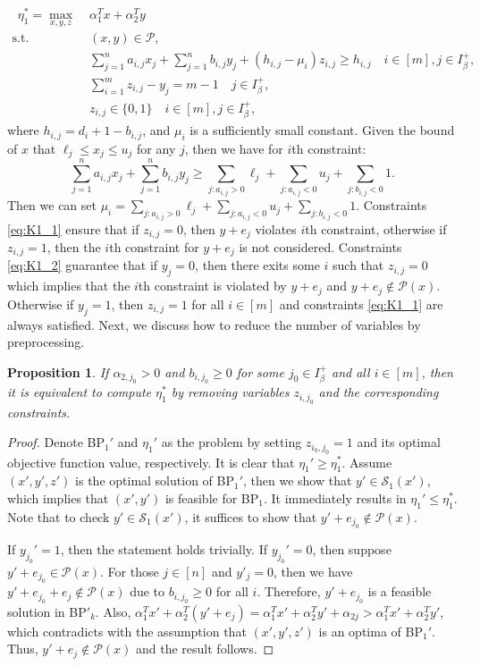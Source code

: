 \documentclass[11pt]{article}
\newtheorem{proposition}{Proposition}
\newcommand{\Pp}{\mathcal{P}}
\newcommand{\Ss}{\mathcal{S}}
\begin{document}
\begin{align}
[\text{BP}_1]~~\eta_1^* = \max_{x, y, z}\; & \alpha_1^Tx + \alpha_2^Ty \nonumber \\
\text{s.t.~~} &  (x, y)\in \Pp, \nonumber \\
& \sum_{j=1}^n a_{i,j} x_j + \sum_{j=1}^n b_{i,j} y_j + (h_{i,j} - \mu_i)z_{i,j} \geq h_{i,j} \quad i \in [m], j\in I_\beta^+, \label{eq:K1_1} \\
& \sum_{i=1}^m z_{i,j} - y_j = m - 1  \quad j\in I_\beta^+, \label{eq:K1_2} \\
& z_{i,j} \in \{0,1\} \quad i \in [m], j\in I_\beta^+, \nonumber
\end{align}
where $h_{i,j} = d_i + 1 - b_{i, j}$, and $\mu_i$ is a sufficiently small constant. Given the bound of $x$ that $\ell_j \leq x_j \leq u_j$ for any $j$, then we have for $i$th constraint:
\[\sum_{j=1}^n a_{i,j} x_j + \sum_{j=1}^n b_{i,j} y_j \geq \sum_{j: a_{i,j} > 0} \ell_j + \sum_{j:a_{i,j}<0}u_j + \sum_{j:b_{i,j}<0} 1. \]
Then we can set $\mu_i = \sum_{j: a_{i,j} > 0} \ell_j + \sum_{j:a_{i,j}<0}u_j + \sum_{j:b_{i,j}<0} 1$. Constraints \eqref{eq:K1_1} ensure that if $z_{i,j} = 0$, then $y + e_j$ violates $i$th constraint, otherwise if $z_{i,j} = 1$, then the $i$th constraint for $y + e_j$ is not considered. Constraints \eqref{eq:K1_2} guarantee that if $y_j = 0$, then there exits some $i$ such that $z_{i,j} = 0$ which implies that the $i$th constraint is violated by $y+e_j$ and $y+e_j \notin \Pp(x)$. Otherwise if $y_j = 1$, then $z_{i,j} = 1$ for all $i \in [m]$ and constraints \eqref{eq:K1_1} are always satisfied.  Next, we discuss how to reduce the number of variables by preprocessing.
\begin{proposition}
	If $\alpha_{2,j_0} > 0$ and $b_{i, j_0} \geq 0$ for some $j_0\in I_\beta^+$ and all $i\in [m]$, then it is equivalent to compute $\eta_1^*$ by removing variables $z_{i, j_0}$ and the corresponding constraints.
\end{proposition}
\begin{proof}
	Denote BP$_1'$ and $\eta_1'$ as the problem by setting $z_{i_0, j_0}=1$ and its optimal objective function value, respectively. It is clear that $\eta_1' \geq \eta_1^*$. Assume $(x', y', z')$ is the optimal solution of BP$_1'$, then we show that $y' \in \Ss_1(x')$, which implies that $(x', y')$ is feasible for BP$_1$. It immediately results in $\eta_1' \leq \eta_1^*$. Note that to check $y' \in \Ss_1(x')$, it suffices to show that $y'+e_{j_0} \notin \Pp(x)$.
	
	If $y_{j_0}' = 1$, then the statement holds trivially. If $y_{j_0}' = 0$, then suppose $y' + e_{j_0} \in \Pp(x)$.  For those $j\in [n]$ and $y'_j=0$, then we have $y' + e_{j_0} + e_j \notin \Pp(x)$ due to $b_{i, j_0} \geq 0$ for all $i$. Therefore, $y'+e_{j_0}$ is a feasible solution in BP$'_k$. Also, $\alpha_1^Tx' + \alpha_2^T(y'+e_j) = \alpha_1^Tx' + \alpha_2^Ty' + \alpha_{2j} > \alpha_1^Tx' + \alpha_2^Ty'$, which contradicts with the assumption that $(x', y', z')$ is an optima of BP$_1'$. Thus, $y' + e_j \notin \Pp(x)$ and the result follows.
\end{proof}
\end{document}
